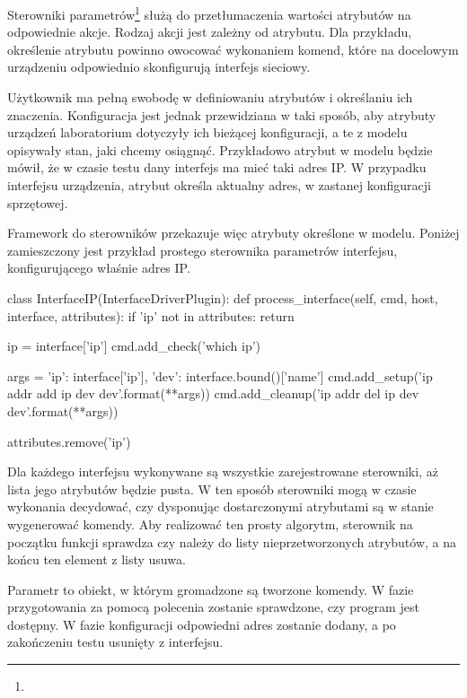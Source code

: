 \documentclass[00-praca-magisterska.tex]{subfiles}
\begin{document}
Sterowniki parametrów\footnote{} służą do przetłumaczenia
wartości atrybutów na odpowiednie akcje. Rodzaj akcji jest zależny od atrybutu.
Dla przykładu, określenie atrybutu  powinno owocować wykonaniem komend,
które na docelowym urządzeniu odpowiednio skonfigurują interfejs sieciowy.

Użytkownik ma pełną swobodę w definiowaniu atrybutów i określaniu ich
znaczenia. Konfiguracja jest jednak przewidziana w taki sposób, aby atrybuty
urządzeń laboratorium dotyczyły ich bieżącej konfiguracji, a te z modelu
opisywały stan, jaki chcemy osiągnąć. Przykładowo atrybut  w modelu
będzie mówił, że w czasie testu dany interfejs ma mieć taki adres IP. W
przypadku interfejsu urządzenia, atrybut  określa aktualny adres, w
zastanej konfiguracji sprzętowej.

Framework do sterowników przekazuje więc atrybuty określone w modelu. Poniżej
zamieszczony jest przykład prostego sterownika parametrów interfejsu,
konfigurującego właśnie adres IP.

\begin{pythoncode}
  class InterfaceIP(InterfaceDriverPlugin):
      def process_interface(self, cmd, host, interface, attributes):
          if 'ip' not in attributes:
              return
  
          ip = interface['ip']
          cmd.add_check('which ip')
  
          args = {'ip': interface['ip'],
                  'dev': interface.bound()['name']}
          cmd.add_setup('ip addr add {ip} dev {dev}'.format(**args))
          cmd.add_cleanup('ip addr del {ip} dev {dev}'.format(**args))
  
          attributes.remove('ip')

\end{pythoncode}

Dla każdego interfejsu wykonywane są wszystkie zarejestrowane sterowniki, aż
lista jego atrybutów będzie pusta. W ten sposób sterowniki mogą w czasie
wykonania decydować, czy dysponując dostarczonymi atrybutami są w stanie
wygenerować komendy. Aby realizować ten prosty algorytm, sterownik na początku
funkcji  sprawdza czy  należy do listy
nieprzetworzonych atrybutów, a na końcu ten element z listy usuwa.

Parametr  to obiekt, w którym gromadzone są tworzone komendy. W fazie
przygotowania za pomocą polecenia  zostanie sprawdzone, czy program
 jest dostępny. W fazie konfiguracji odpowiedni adres zostanie dodany,
a po zakończeniu testu usunięty z interfejsu.
\end{document}
